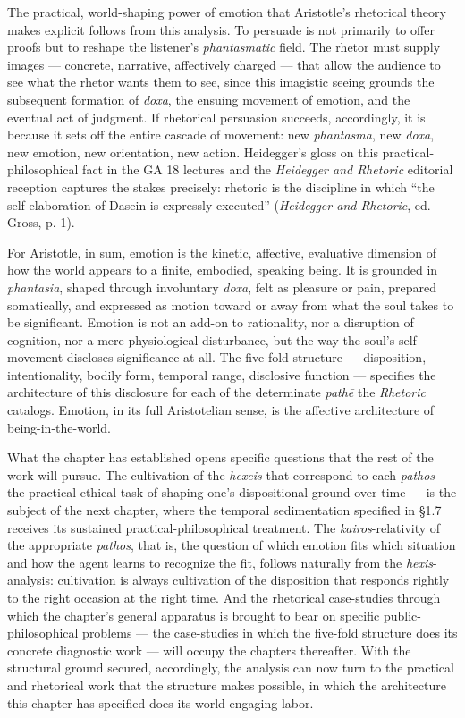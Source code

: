 \documentclass{article}
\begin{document}
The practical, world-shaping power of emotion that Aristotle's rhetorical theory makes explicit follows from this analysis. To persuade is not primarily to offer proofs but to reshape the listener's \textit{phantasmatic} field. The rhetor must supply images --- concrete, narrative, affectively charged --- that allow the audience to see what the rhetor wants them to see, since this imagistic seeing grounds the subsequent formation of \textit{doxa}, the ensuing movement of emotion, and the eventual act of judgment. If rhetorical persuasion succeeds, accordingly, it is because it sets off the entire cascade of movement: new \textit{phantasma}, new \textit{doxa}, new emotion, new orientation, new action. Heidegger's gloss on this practical-philosophical fact in the GA 18 lectures and the \textit{Heidegger and Rhetoric} editorial reception captures the stakes precisely: rhetoric is the discipline in which ``the self-elaboration of Dasein is expressly executed'' (\textit{Heidegger and Rhetoric}, ed. Gross, p. 1).

For Aristotle, in sum, emotion is the kinetic, affective, evaluative dimension of how the world appears to a finite, embodied, speaking being. It is grounded in \textit{phantasia}, shaped through involuntary \textit{doxa}, felt as pleasure or pain, prepared somatically, and expressed as motion toward or away from what the soul takes to be significant. Emotion is not an add-on to rationality, nor a disruption of cognition, nor a mere physiological disturbance, but the way the soul's self-movement discloses significance at all. The five-fold structure --- disposition, intentionality, bodily form, temporal range, disclosive function --- specifies the architecture of this disclosure for each of the determinate \textit{pathē} the \textit{Rhetoric} catalogs. Emotion, in its full Aristotelian sense, is the affective architecture of being-in-the-world.

What the chapter has established opens specific questions that the rest of the work will pursue. The cultivation of the \textit{hexeis} that correspond to each \textit{pathos} --- the practical-ethical task of shaping one's dispositional ground over time --- is the subject of the next chapter, where the temporal sedimentation specified in \S1.7 receives its sustained practical-philosophical treatment. The \textit{kairos}-relativity of the appropriate \textit{pathos}, that is, the question of which emotion fits which situation and how the agent learns to recognize the fit, follows naturally from the \textit{hexis}-analysis: cultivation is always cultivation of the disposition that responds rightly to the right occasion at the right time. And the rhetorical case-studies through which the chapter's general apparatus is brought to bear on specific public-philosophical problems --- the case-studies in which the five-fold structure does its concrete diagnostic work --- will occupy the chapters thereafter. With the structural ground secured, accordingly, the analysis can now turn to the practical and rhetorical work that the structure makes possible, in which the architecture this chapter has specified does its world-engaging labor.
\end{document}
